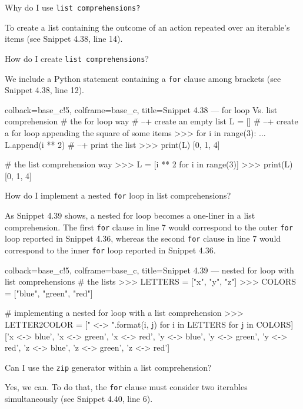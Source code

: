 \documentclass[a4paper,11pt]{book}
\newcommand{\question}[1]{%
    \begin{tcolorbox}[colback=comp_c!10,colframe=comp_c,sidebyside align=top,width=\linewidth,before skip=1ex]
        #1
    \end{tcolorbox}
    \switchcolumn%
}
\newcommand{\note}[1]{%
    \begin{tcolorbox}[colback=white!0,colframe=white!10,width=\linewidth,before skip=1ex]
        #1
    \end{tcolorbox}
}
\begin{document}
\begin{paracol}{2}
	\question{\raggedright Why do I use \texttt{list comprehensions?}}
	\note{To create a list containing the outcome of an action repeated over an iterable's items (see Snippet 4.38, line 14).}
\end{paracol}

\begin{paracol}{2}
	\question{\raggedright How do I create \texttt{list comprehensions}?}
	\note{We include a Python statement containing a \texttt{for} clause among brackets (see Snippet 4.38, line 12).}
\end{paracol}
\clearpage

\begin{pythoncode}[linenos=true,]{colback=base_c!5, colframe=base_c, title=\sffamily Snippet 4.38 --- for loop Vs. list comprehension}
# the for loop way
# --+ create an empty list
L = []
# --+ create a for loop appending the square of some items
>>> for i in range(3):
...    L.append(i ** 2)
# --+ print the list
>>> print(L)
[0, 1, 4]

# the list comprehension way
>>> L = [i ** 2 for i in range(3)]
>>> print(L)
[0, 1, 4]

\end{pythoncode}

\begin{paracol}{2}
	\question{\raggedright How do I implement a nested \texttt{for} loop in list comprehensions?}
	\note{As Snippet 4.39 shows, a nested for loop becomes a one-liner in a list comprehension. The first \texttt{for} clause in line 7 would correspond to the outer \texttt{for} loop reported in Snippet 4.36, whereas the second \texttt{for} clause in line 7 would correspond to the inner \texttt{for} loop reported in Snippet 4.36.}
\end{paracol}

\begin{pythoncode}[linenos=true,]{colback=base_c!5, colframe=base_c, title=\sffamily Snippet 4.39 --- nested for loop with list comprehensions}
# the lists 
>>> LETTERS = ["x", "y", "z"]
>>> COLORS = ["blue", "green", "red"]

# implementing a nested for loop with a list comprehension
>>> LETTER2COLOR = ["{} <-> {}".format(i, j) for i in LETTERS for j in COLORS]
['x <-> blue',
 'x <-> green',
 'x <-> red',
 'y <-> blue',
 'y <-> green',
 'y <-> red',
 'z <-> blue',
 'z <-> green',
 'z <-> red']
\end{pythoncode}

\begin{paracol}{2}
	\question{\raggedright Can I use the \texttt{zip} generator within a list comprehension?}
	\note{Yes, we can. To do that, the \texttt{for} clause must consider two iterables simultaneously (see Snippet 4.40, line 6).}
\end{paracol}
\clearpage
\end{document}
